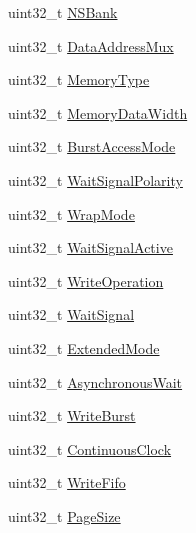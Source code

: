\begin{DoxyCompactItemize}
\item 
uint32\+\_\+t \hyperlink{struct_f_m_c___n_o_r_s_r_a_m___init_type_def_ad43ca00a46db6527d3ac3fde29ec20cb}{N\+S\+Bank}
\item 
uint32\+\_\+t \hyperlink{struct_f_m_c___n_o_r_s_r_a_m___init_type_def_a5b7e34c6d9947bbd35fdede522088372}{Data\+Address\+Mux}
\item 
uint32\+\_\+t \hyperlink{struct_f_m_c___n_o_r_s_r_a_m___init_type_def_a53eb4b6eb5a7fef776280a6f95a52dbf}{Memory\+Type}
\item 
uint32\+\_\+t \hyperlink{struct_f_m_c___n_o_r_s_r_a_m___init_type_def_a2516472b7d961cd65c000f991536bf2d}{Memory\+Data\+Width}
\item 
uint32\+\_\+t \hyperlink{struct_f_m_c___n_o_r_s_r_a_m___init_type_def_a4ae26963827925c3fa05a4acac6bf7de}{Burst\+Access\+Mode}
\item 
uint32\+\_\+t \hyperlink{struct_f_m_c___n_o_r_s_r_a_m___init_type_def_ac32cd637777b91e2898d2a661df4facb}{Wait\+Signal\+Polarity}
\item 
uint32\+\_\+t \hyperlink{struct_f_m_c___n_o_r_s_r_a_m___init_type_def_a1f1343fd5065e0280060394c5c00303a}{Wrap\+Mode}
\item 
uint32\+\_\+t \hyperlink{struct_f_m_c___n_o_r_s_r_a_m___init_type_def_a7c1ca739b9c8ec32feebc9a84a6a4b1c}{Wait\+Signal\+Active}
\item 
uint32\+\_\+t \hyperlink{struct_f_m_c___n_o_r_s_r_a_m___init_type_def_a71050a4b16715f3acf90c4a7b92fd91f}{Write\+Operation}
\item 
uint32\+\_\+t \hyperlink{struct_f_m_c___n_o_r_s_r_a_m___init_type_def_a7cff014761b0db5e497e668b66ac0507}{Wait\+Signal}
\item 
uint32\+\_\+t \hyperlink{struct_f_m_c___n_o_r_s_r_a_m___init_type_def_a4e181791a7d3f24a7899eff5e03efe44}{Extended\+Mode}
\item 
uint32\+\_\+t \hyperlink{struct_f_m_c___n_o_r_s_r_a_m___init_type_def_a6f7202e07e74e5661035e39d6835fc01}{Asynchronous\+Wait}
\item 
uint32\+\_\+t \hyperlink{struct_f_m_c___n_o_r_s_r_a_m___init_type_def_a39fda8766e93963f67170f40f2983e87}{Write\+Burst}
\item 
uint32\+\_\+t \hyperlink{struct_f_m_c___n_o_r_s_r_a_m___init_type_def_afeddf8d3760034019b347645ef85e31e}{Continuous\+Clock}
\item 
uint32\+\_\+t \hyperlink{struct_f_m_c___n_o_r_s_r_a_m___init_type_def_a63aa26b1c1e61a2ac9b9e59d0b2c7b9d}{Write\+Fifo}
\item 
uint32\+\_\+t \hyperlink{struct_f_m_c___n_o_r_s_r_a_m___init_type_def_a419ca7c73455102bad5d08bcb499535e}{Page\+Size}
\end{DoxyCompactItemize}


